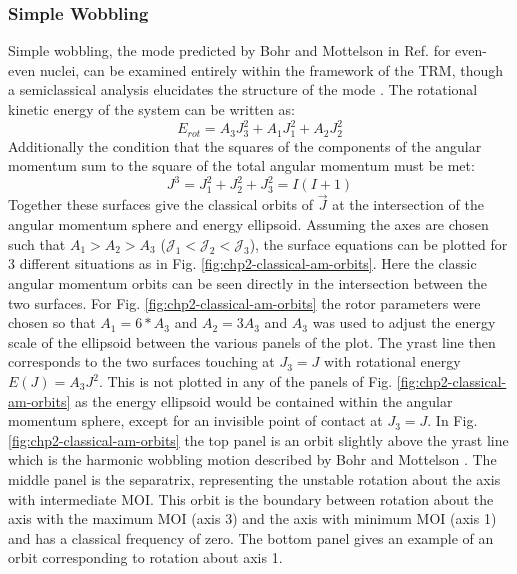 \subsubsection{Simple Wobbling}
\label{sssec:models-wobbling-simple-wobbling}
Simple wobbling, the mode predicted by Bohr and Mottelson in Ref. \cite{bohrMottelson2} for even-even nuclei, can be examined entirely within the framework of the TRM, though a semiclassical analysis elucidates the structure of the mode \cite{frauendorfTransverseWobbling}. The rotational kinetic energy of the system can be written as:
\begin{equation}
\label{eqn:chp2-rot-kin-en}
E_{rot} = A_3J_3^2 + A_1J_1^2 + A_2J_2^2
\end{equation}
Additionally the condition that the squares of the components of the angular momentum sum to the square of the total angular momentum must be met:
\begin{equation}
\label{eqn:chp2-am-cons}
J^3 = J_1^2 + J_2^2 + J_3^2 = I(I+1)
\end{equation}
Together these surfaces give the classical orbits of $\vec{J}$ at the intersection of the angular momentum sphere and energy ellipsoid. Assuming the axes are chosen such that $A_1>A_2>A_3$ ($\mathcal{J}_1<\mathcal{J}_2<\mathcal{J}_3$), the surface equations can be plotted for 3 different situations as in Fig. \ref{fig:chp2-classical-am-orbits}. Here the classic angular momentum orbits can be seen directly in the intersection between the two surfaces. For Fig. \ref{fig:chp2-classical-am-orbits} the rotor parameters were chosen so that $A_1=6*A_3$ and $A_2=3A_3$ and $A_3$ was used to adjust the energy scale of the ellipsoid between the various panels of the plot. The yrast line then corresponds to the two surfaces touching at $J_3=J$ with rotational energy $E(J)=A_3J^2$. This is not plotted in any of the panels of Fig. \ref{fig:chp2-classical-am-orbits} as the energy ellipsoid would be contained within the angular momentum sphere, except for an invisible point of contact at $J_3=J$. In Fig. \ref{fig:chp2-classical-am-orbits} the top panel is an orbit slightly above the yrast line which is the harmonic wobbling motion described by Bohr and Mottelson \cite{bohrMottelson2}. The middle panel is the separatrix, representing the unstable rotation about the axis with intermediate MOI. This orbit is the boundary between rotation about the axis with the maximum MOI (axis 3) and the axis with minimum MOI (axis 1) and has a classical frequency of zero. The bottom panel gives an example of an orbit corresponding to rotation about axis 1.
